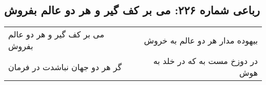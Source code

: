 \begin{center}
\section*{رباعی شماره ۲۲۶: می بر کف گیر و هر دو عالم بفروش}
\label{sec:sh226}
\begin{longtable}{l p{0.5cm} r}
می بر کف گیر و هر دو عالم بفروش
&&
بیهوده مدار هر دو عالم به خروش
\\
گر هر دو جهان نباشدت در فرمان
&&
در دوزخ مست به که در خلد به هوش
\\
\end{longtable}
\end{center}
